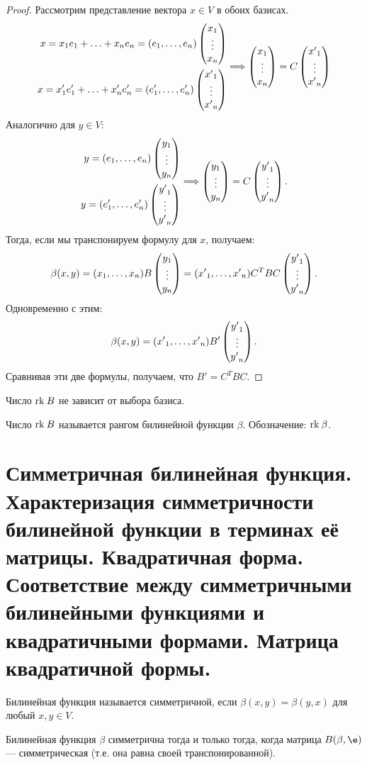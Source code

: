 \begin{proof}
Рассмотрим представление вектора $x \in V$ в обоих базисах.
\begin{gather*}
\begin{aligned}
x = x_1e_1 + \ldots + x_ne_n = (e_1, \ldots, e_n)\begin{pmatrix}{x}_1 \\\vdots\\{x}_n\end{pmatrix} \\
x = x'_1e'_1 + \ldots + x'_ne'_n = (e'_1, \ldots, e'_n) \begin{pmatrix}{x'}_1 \\\vdots\\{x'}_n\end{pmatrix}
\end{aligned}
\Longrightarrow
\begin{pmatrix}{x}_1 \\\vdots\\{x}_n\end{pmatrix} = C\begin{pmatrix}{x'}_1 \\\vdots\\{x'}_n\end{pmatrix}
\end{gather*}
Аналогично для $y \in V$:
\begin{gather*}
\begin{aligned}
y = (e_1, \ldots, e_n)\begin{pmatrix}{y}_1 \\\vdots\\{y}_n\end{pmatrix} \\
y = (e'_1, \ldots, e'_n) \begin{pmatrix}{y'}_1 \\\vdots\\{y'}_n\end{pmatrix}
\end{aligned}
\Longrightarrow
\begin{pmatrix}{y}_1 \\\vdots\\{y}_n\end{pmatrix} = C\begin{pmatrix}{y'}_1 \\\vdots\\{y'}_n\end{pmatrix}.
\end{gather*}
Тогда,  если мы транспонируем формулу для $x$, получаем:
$$
\beta(x, y) = ({x}_1, \ldots, {x}_n)B\begin{pmatrix}{y}_1 \\\vdots\\{y}_n\end{pmatrix} = ({x'}_1, \ldots, {x'}_n)C^TBC\begin{pmatrix}{y'}_1 \\\vdots\\{y'}_n\end{pmatrix}.
$$
Одновременно с этим:
$$
\beta(x, y) = ({x'}_1, \ldots, {x'}_n)B'\begin{pmatrix}{y'}_1 \\\vdots\\{y'}_n\end{pmatrix}.
$$
Сравнивая эти две формулы, получаем, что $B' = C^TBC$.
\end{proof}

\begin{Consequence}
Число $\mathrm{rk}\: B$ не зависит от выбора базиса.
\end{Consequence}

\begin{Def}
Число $\mathrm{rk}\: B$ называется рангом билинейной функции $\beta$. Обозначение: $\mathrm{rk}\: \beta$.
\end{Def}

\section{Симметричная билинейная функция. Характеризация симметричности билинейной функции в терминах её матрицы. Квадратичная форма. Соответствие между симметричными билинейными функциями и квадратичными формами. Матрица квадратичной формы.}

\begin{Def}
Билинейная функция называется симметричной, если $\beta(x, y) =\beta(y, x)$ для любый $x, y \in V$.
\end{Def}

\begin{Suggestion}
Билинейная функция $\beta$ симметрична тогда и только тогда, когда матрица $B(\beta, \e)$ --- симметрическая (т.е. она равна своей транспонированной).
\end{Suggestion}

